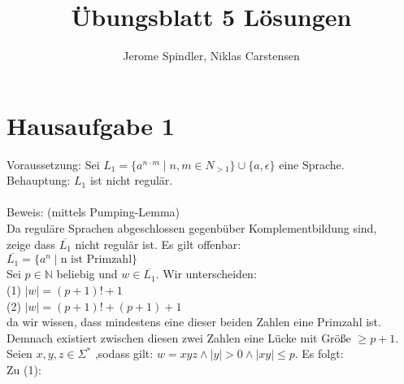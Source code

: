 \documentclass{article}
\title{Übungsblatt 5 Lösungen}
\author{Jerome Spindler, Niklas Carstensen}
\begin{document}
\maketitle

\section{Hausaufgabe 1}

Voraussetzung: Sei $L_1 = \{a^{n \cdot m} \mid n,m \in N_{>1} \} \cup \{a, \epsilon\}$ eine Sprache.\\
Behauptung: $L_1$ ist nicht regulär.\\
\\
Beweis: (mittels Pumping-Lemma)\\
Da reguläre Sprachen abgeschlossen gegenbüber Komplementbildung sind,\\
zeige dass $\overline{L_1}$ nicht regulär ist. Es gilt offenbar:\\
$\overline{L_1} = \{a^n \mid \textrm{n ist Primzahl}\}$\\
Sei $p \in \mathbb{N}$ beliebig und $w \in \overline{L_1}$. Wir unterscheiden:\\
(1) $|w| = (p+1)! + 1$\\
(2) $|w| = (p+1)! + (p+ 1) + 1$\\
da wir wissen, dass mindestens eine dieser beiden Zahlen eine Primzahl ist.\\
Demnach existiert zwischen diesen zwei Zahlen eine Lücke mit Größe $\geq p + 1$.\\
Seien $x,y,z \in \Sigma^*$ ,sodass gilt: $w = xyz \land |y| > 0 \land |xy| \leq p$. Es folgt:\\
Zu (1):\\
\end{document}

